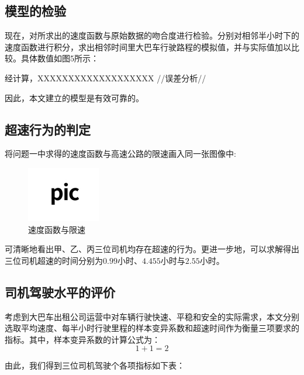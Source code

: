 \documentclass[bwprint]{cumcmthesis}
\begin{document}
        \subsection{模型的检验}
            现在，对所求出的速度函数与原始数据的吻合度进行检验。分别对相邻半小时下的速度函数进行积分，求出相邻时间里大巴车行驶路程的模拟值，并与实际值加以比较。具体数值如图5所示：

            经计算，XXXXXXXXXXXXXXXXXXX  //误差分析// 
        
            因此，本文建立的模型是有效可靠的。
        
        \subsection{超速行为的判定}
        将问题一中求得的速度函数与高速公路的限速画入同一张图像中:
        \begin{figure}[htbp]
            \centering

            \includegraphics[width=0.5\linewidth]{test.jpg}
            \caption{速度函数与限速}
        \end{figure}

        可清晰地看出甲、乙、丙三位司机均存在超速的行为。更进一步地，可以求解得出三位司机超速的时间分别为$0.99$小时、$4.455$小时与$2.55$小时。

        \subsection{司机驾驶水平的评价}
        考虑到大巴车出租公司运营中对车辆行驶快速、平稳和安全的实际需求，本文分别选取平均速度、每半小时行驶里程的样本变异系数和超速时间作为衡量三项要求的指标。其中，样本变异系数的计算公式为：
        \begin{equation*}
            1+1=2
        \end{equation*}

        由此，我们得到三位司机驾驶个各项指标如下表：
        
\end{document}
